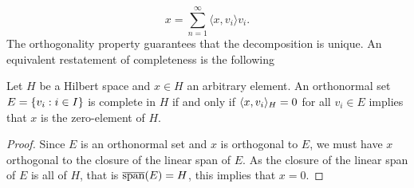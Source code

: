 \documentclass[../thesis.tex]{subfiles}
\begin{document}
\begin{equation*}%
    x= \sum_{n=1}^{\infty} \langle x, v_i \rangle v_i . %
\end{equation*}
The orthogonality property guarantees that the decomposition is unique. %
An equivalent restatement of completeness is the following
\begin{lemma}\label{lem:ONB_alternative_def}
    Let $H$ be a Hilbert space and $x\in H$ an arbitrary element. An orthonormal set $E = \{v_i: i \in I\}$ is complete in $H$ if and only if $\langle x, v_i\rangle_{H} = 0$ for all $v_i\in E$ implies that $x$ is the zero-element of $H$.
\end{lemma}
\begin{proof}
    Since $E$ is an orthonormal set and $x$ is orthogonal to $E$, we must have $x$ orthogonal to the closure of the linear span of $E$. As the closure of the linear span of $E$ is all of $H$, that is $\overline{\operatorname{span}}(E) = H$, this implies that $x=0$. %
\end{proof}

\end{document}
